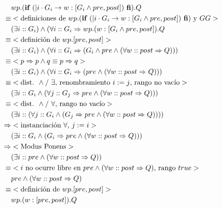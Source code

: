 \documentclass{article}
\begin{document}
\section{}

\begin{align*}
 & wp.(\text{{\bf if }} (| i \cdot G_i \rightarrow w : [G_i \wedge pre, post]) \text{ {\bf fi}}).Q \\
 \equiv & <\text{definiciones de } wp.(\text{{\bf if }} (| i \cdot G_i \rightarrow w : [G_i \wedge pre, post]) \text{ {\bf fi}}) \text{ y } GG> \\
 & (\exists i :: G_i) \wedge (\forall i :: G_i \Rightarrow wp.(w : [G_i \wedge pre, post]).Q \\
 \equiv & <\text{definición de } wp.[pre,post]> \\
 & (\exists i :: G_i) \wedge (\forall i :: G_i \Rightarrow (G_i \wedge pre \wedge (\forall w :: post \Rightarrow Q))) \\
 \equiv & <p \Rightarrow p \wedge q \equiv p \Rightarrow q> \\
 & (\exists i :: G_i) \wedge (\forall i :: G_i \Rightarrow (pre \wedge (\forall w :: post \Rightarrow Q))) \\
 \equiv & <\text{dist. } \wedge \text{/ } \exists \text{, renombramiento } i := j \text{, rango no vacío}> \\
 & (\exists i :: G_i \wedge (\forall j :: G_j \Rightarrow pre \wedge (\forall w :: post \Rightarrow Q))) \\
 \equiv & <\text{dist. } \wedge \text{/ } \forall \text{, rango no vacío}> \\
 & (\exists i :: (\forall j :: G_i \wedge (G_j \Rightarrow pre \wedge (\forall w :: post \Rightarrow Q)))) \\
 \Rightarrow & <\text{instanciación } \forall \text{, } j := i> \\
 & (\exists i :: G_i \wedge (G_i \Rightarrow pre \wedge (\forall w :: post \Rightarrow Q))) \\
 \Rightarrow & <\text{Modus Ponens}> \\
 & (\exists i :: pre \wedge (\forall w :: post \Rightarrow Q)) \\
 \equiv & <i \text{ no ocurre libre en } pre \wedge (\forall w :: post \Rightarrow Q) \text{, rango } true> \\
 & pre \wedge (\forall w :: post \Rightarrow Q) \\
 \equiv & <\text{definición de } wp.[pre,post]> \\
 & wp.(w : [pre,post]).Q
\end{align*}
\end{document}
